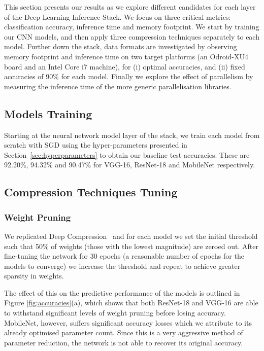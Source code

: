 \documentclass[conference]{IEEEtran}
\begin{document}
This section presents our results as we explore different candidates for each layer of the Deep Learning Inference Stack. We focus on three critical metrics: classification accuracy, inference time and memory footprint. We start by training our CNN models, and then apply three compression techniques separately to each model. Further down the stack, data formats are investigated by observing memory footprint and inference time on two target platforms (an Odroid-XU4 board and an Intel Core i7 machine), for (i) optimal accuracies, and (ii) fixed accuracies of 90\% for each model. Finally we explore the effect of parallelism by measuring the inference time of the more generic parallelisation libraries.

\subsection{Models Training}

Starting at the neural network model layer of the stack, we train each model from scratch with SGD using the hyper-parameters presented in Section~\ref{sec:hyperparameters} to obtain our baseline test accuracies. These are 92.20\%, 94.32\% and 90.47\% for VGG-16, ResNet-18 and MobileNet respectively. 

\subsection{Compression Techniques Tuning}\subsubsection{Weight Pruning}

We replicated Deep Compression~\cite{han2015deep} and for each model we set the initial threshold such that 50\% of weights (those with the lowest magnitude) are zeroed out. After fine-tuning the network for 30 epochs (a reasonable number of epochs for the models to converge) we increase the threshold and repeat to achieve greater sparsity in weights. 

The effect of this on the predictive performance of the models is outlined in Figure \ref{fig:accuracies}(a), which shows that both ResNet-18 and VGG-16 are able to withstand significant levels of weight pruning before losing accuracy. MobileNet, however, suffers significant accuracy losses which we attribute to its already optimised parameter count. Since this is a very aggressive method of parameter reduction, the network is not able to recover its original accuracy. 
\end{document}
